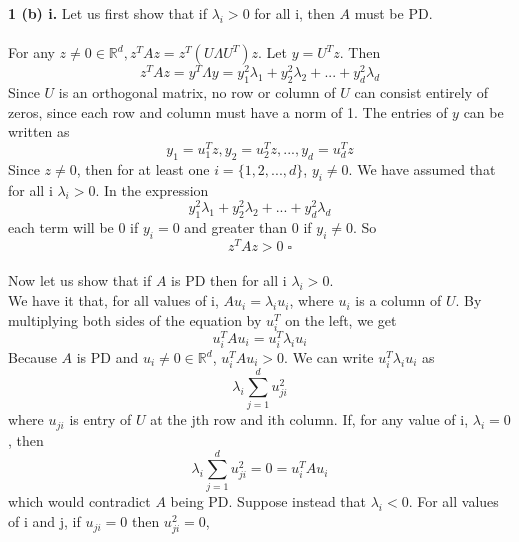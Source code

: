 \documentclass[12 pt]{article}        	%
\begin{document}
\textbf{1 (b) i.}
Let us first show that if $ \lambda_i > 0 $ for all i, then $ A $ must be PD. \\ \\
For any $ z \neq 0 \in \mathbb{R}^d, z^T A z = z^T (U \Lambda U^T) z $. Let $ y = U^T z $. Then \\
\begin{displaymath} 
  z^T A z = y^T \Lambda y = y_1^2 \lambda_1 + y_2^2 \lambda_2 + ... + y_d^2 \lambda_d
\end{displaymath}
Since $ U $ is an orthogonal matrix, no row or column of $ U $ can consist entirely of zeros, since each row and column must have a norm of 1. The entries of $ y $ can be written as
\begin{displaymath}
  y_1 = u_1^T z, y_2 = u_2^T z, ... , y_d = u_d^T z
\end{displaymath}
Since $ z \neq 0 $, then for at least one $ i = \{1, 2, ..., d\} $, $ y_i \neq 0 $. We have assumed that for all i $ \lambda_i > 0 $. In the expression
\begin{displaymath}
  y_1^2 \lambda_1 + y_2^2 \lambda_2 + ... + y_d^2 \lambda_d
\end{displaymath}
each term will be 0 if $ y_i = 0 $ and greater than 0 if $ y_i \neq 0 $. So 
\begin{displaymath}
  z^T A z > 0 \; \square
\end{displaymath} \\
Now let us show that if $ A $ is PD then for all i $ \lambda_i > 0 $. \\ 
We have it that, for all values of i, $ A u_i = \lambda_i u_i $, where $ u_i $ is a column of $ U $. By multiplying both sides of the equation by $ u_i^T $ on the left, we get
\begin{displaymath}
  u_i^T A u_i = u_i^T \lambda_i u_i 
\end{displaymath}
Because $ A $ is PD and $ u_i \neq 0 \in \mathbb{R}^d $, $ u_i^T A u_i > 0 $. We can write $ u_i^T \lambda_i u_i $ as
\begin{displaymath}
  \lambda_i \sum_{j=1}^{d}u_{ji}^2
\end{displaymath}
where $ u_{ji} $ is entry of $ U $ at the jth row and ith column. If, for any value of i, $ \lambda_i = 0 $, then  
\begin{displaymath}
  \lambda_i \sum_{j=1}^{d}u_{ji}^2 = 0 = u_i^T A u_i 
\end{displaymath}
which would contradict $ A $ being PD. 
Suppose instead that $ \lambda_i < 0 $. 
For all values of i and j, if $ u_{ji} = 0 $ then $ u_{ji}^2 = 0 $, 
\end{document}
